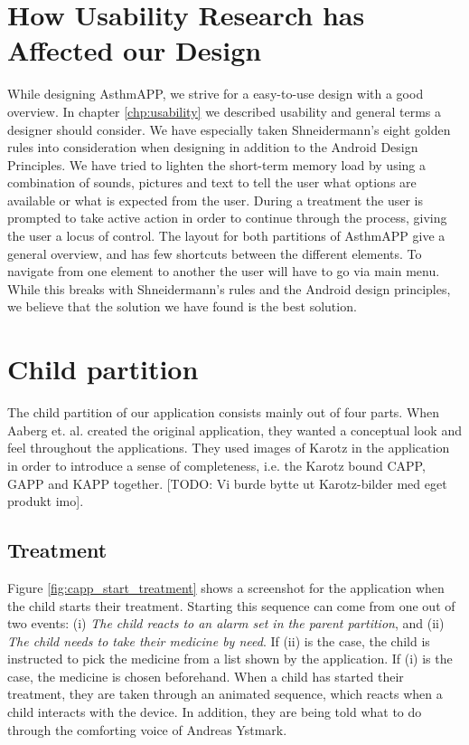 \section{How Usability Research has Affected our Design}
\label{sec:usability-affect-design}
While designing AsthmAPP, we strive for a easy-to-use design with a good overview. In chapter \ref{chp:usability} we described usability and general terms a designer should consider. We have especially taken Shneidermann's eight golden rules into consideration when designing\cite{shneiderman2003designing} in addition to the Android Design Principles\cite{androiddesign}. 
We have tried to lighten the short-term memory load by using a combination of sounds, pictures and text to tell the user what options are available or what is expected from the user. During a treatment the user is prompted to take active action in order to continue through the process, giving the user a locus of control. 
The layout for both partitions of AsthmAPP give a general overview, and has few shortcuts between the different elements. To navigate from one element to another the user will have to go via main menu. While this breaks with Shneidermann's rules and the Android design principles, we believe that the solution we have found is the best solution.


\section{Child partition}
\label{sec:description-child-partition}
The child partition of our application consists mainly out of four parts. When Aaberg et. al. created the original application, they wanted a conceptual look and feel throughout the applications. They used images of Karotz in the application in order to introduce a sense of completeness, i.e. the Karotz bound CAPP, GAPP and KAPP together. [TODO: Vi burde bytte ut Karotz-bilder med eget produkt imo]. 

\subsection{Treatment}
\label{sec:sec:description-treatment}
Figure \ref{fig:capp_start_treatment} shows a screenshot for the application when the child starts their treatment. Starting this sequence can come from one out of two events: (i) \emph{The child reacts to an alarm set in the parent partition}, and (ii) \emph{The child needs to take their medicine by need}. If (ii) is the case, the child is instructed to pick the medicine from a list shown by the application. If (i) is the case, the medicine is chosen beforehand. When a child has started their treatment, they are taken through an animated sequence, which reacts when a child interacts with the device. In addition, they are being told what to do through the comforting voice of Andreas Ystmark.  



